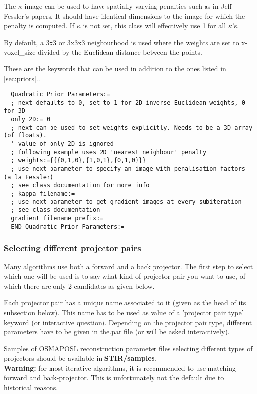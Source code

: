 \documentclass{article}
\begin{document}
  The $\kappa$ image can be used to have spatially-varying penalties such as in 
  Jeff Fessler's papers. It should have identical dimensions to the image for which the
  penalty is computed. If $\kappa$ is not set, this class will effectively
  use 1 for all $\kappa$'s.

  By default, a 3x3 or 3x3x3 neigbourhood is used where the weights are set to 
  x-voxel_size divided by the Euclidean distance between the points.
 
{ 
}
  These are the keywords that can be used in addition to the ones listed in \ref{sec:priors}..
  \begin{verbatim}
  Quadratic Prior Parameters:=
  ; next defaults to 0, set to 1 for 2D inverse Euclidean weights, 0 for 3D 
  only 2D:= 0
  ; next can be used to set weights explicitly. Needs to be a 3D array (of floats).
  ' value of only_2D is ignored
  ; following example uses 2D 'nearest neighbour' penalty
  ; weights:={{{0,1,0},{1,0,1},{0,1,0}}}
  ; use next parameter to specify an image with penalisation factors (a la Fessler)
  ; see class documentation for more info
  ; kappa filename:=
  ; use next parameter to get gradient images at every subiteration
  ; see class documentation
  gradient filename prefix:= 
  END Quadratic Prior Parameters:=
  \end{verbatim}

\subsubsection{
Selecting different projector pairs}
\label{sec:projectorpairs}
Many algorithms use both a forward and a back projector. The 
first step to select which one will be used is to say what kind 
of projector pair you want to use, of which there are only 2 
candidates as given below. 


Each projector pair has a unique name associated to it (given 
as the head of its subsection below). This name has to be used 
as value of a 'projector pair type' keyword (or interactive question). 
Depending on the projector pair type, different parameters have 
to be given in the.par file (or will be asked interactively).


Samples of OSMAPOSL reconstruction parameter files selecting 
different types of projectors should be available in \textbf{STIR/samples}.\\
\textbf{Warning:} for most iterative algorithms, it is recommended 
to use matching forward and back-projector. This is unfortunately 
not the default due to historical reasons.
\end{document}
